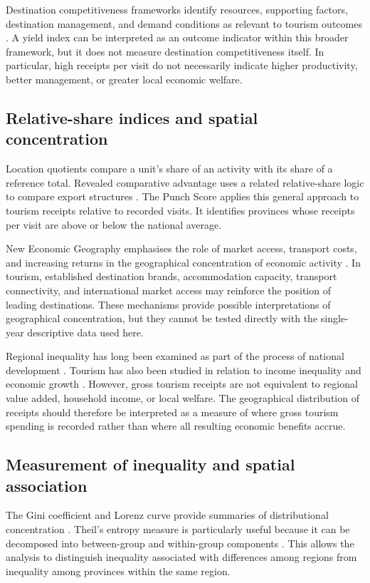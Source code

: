 \documentclass[11pt,a4paper]{article}
\theoremstyle{plain}\newtheorem{proposition}{Proposition}
\theoremstyle{definition}\newtheorem{definition}{Definition}
\begin{document}
Destination competitiveness frameworks identify resources, supporting factors, destination management, and demand conditions as relevant to tourism outcomes \citep{dwyer2003}. A yield index can be interpreted as an outcome indicator within this broader framework, but it does not measure destination competitiveness itself. In particular, high receipts per visit do not necessarily indicate higher productivity, better management, or greater local economic welfare.

\subsection{Relative-share indices and spatial concentration}
Location quotients compare a unit's share of an activity with its share of a reference total. Revealed comparative advantage uses a related relative-share logic to compare export structures \citep{isard1960,balassa1965}. The Punch Score applies this general approach to tourism receipts relative to recorded visits. It identifies provinces whose receipts per visit are above or below the national average.

New Economic Geography emphasises the role of market access, transport costs, and increasing returns in the geographical concentration of economic activity \citep{krugman1991}. In tourism, established destination brands, accommodation capacity, transport connectivity, and international market access may reinforce the position of leading destinations. These mechanisms provide possible interpretations of geographical concentration, but they cannot be tested directly with the single-year descriptive data used here.

Regional inequality has long been examined as part of the process of national development \citep{williamson1965}. Tourism has also been studied in relation to income inequality and economic growth \citep{alam2016,balaguer2002,brida2016}. However, gross tourism receipts are not equivalent to regional value added, household income, or local welfare. The geographical distribution of receipts should therefore be interpreted as a measure of where gross tourism spending is recorded rather than where all resulting economic benefits accrue.

\subsection{Measurement of inequality and spatial association}
The Gini coefficient and Lorenz curve provide summaries of distributional concentration \citep{cowell2011}. Theil's entropy measure is particularly useful because it can be decomposed into between-group and within-group components \citep{theil1967,shorrocks1980}. This allows the analysis to distinguish inequality associated with differences among regions from inequality among provinces within the same region.
\end{document}
